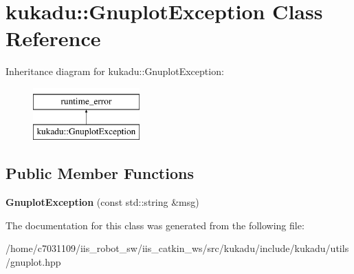 \hypertarget{classkukadu_1_1GnuplotException}{\section{kukadu\-:\-:Gnuplot\-Exception Class Reference}
\label{classkukadu_1_1GnuplotException}
}
Inheritance diagram for kukadu\-:\-:Gnuplot\-Exception\-:\begin{figure}[H]
\begin{center}
\leavevmode
\includegraphics[height=2.000000cm]{classkukadu_1_1GnuplotException}
\end{center}
\end{figure}
\subsection*{Public Member Functions}
\begin{DoxyCompactItemize}
\item 
\hypertarget{classkukadu_1_1GnuplotException_a7bedf6ab003286b0b0cba258b6592d75}{{\bfseries Gnuplot\-Exception} (const std\-::string \&msg)}\label{classkukadu_1_1GnuplotException_a7bedf6ab003286b0b0cba258b6592d75}

\end{DoxyCompactItemize}


The documentation for this class was generated from the following file\-:\begin{DoxyCompactItemize}
\item 
/home/c7031109/iis\-\_\-robot\-\_\-sw/iis\-\_\-catkin\-\_\-ws/src/kukadu/include/kukadu/utils/gnuplot.\-hpp\end{DoxyCompactItemize}
